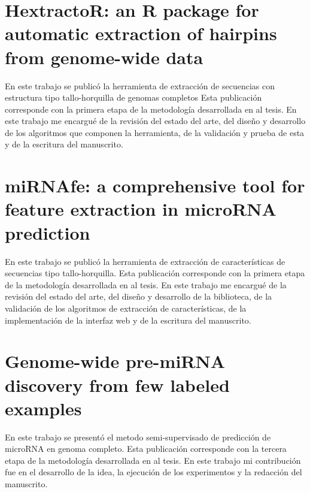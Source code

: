 \begin{appendices}
	\chapter{HextractoR: an R package for automatic extraction of hairpins from genome-wide data}
	\label{sec:hextractor}
	En este trabajo se publicó la herramienta de extracción de secuencias con estructura tipo tallo-horquilla de genomas completos Esta publicación
	corresponde con la primera etapa de la metodología desarrollada en al tesis. En este trabajo me encargué de la revisión del estado del arte, del diseño
	y desarrollo de los algoritmos que componen la herramienta, de la validación y prueba de esta y de la escritura del manuscrito.
	

	\chapter{miRNAfe: a comprehensive tool for feature extraction in microRNA prediction}
	\label{sec:mirnafe}
	En este trabajo se publicó la herramienta de extracción de características de secuencias tipo tallo-horquilla. Esta publicación corresponde con la primera
	etapa de la metodología desarrollada en al tesis. En este trabajo me encargué de la revisión del estado del arte, del diseño y desarrollo de la biblioteca,
	de la validación de los algoritmos de extracción de características, de la implementación de la interfaz web y de la escritura del manuscrito.
	
	

	\chapter{Genome-wide pre-miRNA discovery from few labeled examples}
	\label{sec:mirnass}
	En este trabajo se presentó el metodo semi-supervisado de predicción de microRNA en genoma completo. Esta publicación corresponde con la tercera etapa de
	la metodología desarrollada en al tesis. En este trabajo mi contribución fue en el desarrollo de la idea, la ejecución de los experimentos y la redacción
	del manuscrito.
	
	
\end{appendices}
